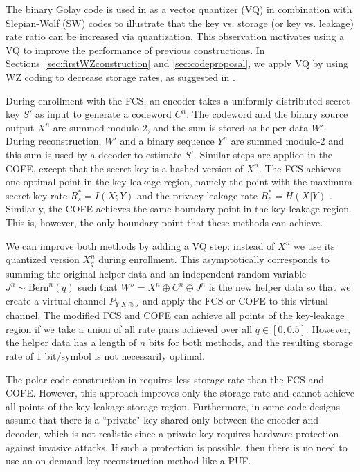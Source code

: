 \documentclass[journal,10pt,twoside]{IEEEtran}
\newcommand*\xor{\mathbin{\oplus}}
\begin{document}
The binary Golay code is used in \cite{IgnaTrans} as a vector quantizer (VQ) in combination with Slepian-Wolf (SW) codes \cite{SW} to illustrate that the key vs. storage (or key vs. leakage) rate ratio can be increased via quantization. This observation motivates using a VQ to improve the performance of previous constructions. In Sections~\ref{sec:firstWZconstruction} and \ref{sec:codeproposal}, we apply VQ by using WZ coding to decrease storage rates, as suggested in \cite[Remark 4.5]{Blochbook}. 


During enrollment with the FCS, an encoder takes a uniformly distributed secret key $S'$ as input to generate a codeword $C^n$. The codeword and the binary source output $X^n$ are summed modulo-2, and the sum is stored as helper data $W'$. During reconstruction, $W'$ and a binary sequence $Y^n$ are summed modulo-2 and this sum is used by a decoder to estimate $S'$. Similar steps are applied in the COFE, except that the secret key is a hashed version of $X^n$. The FCS achieves one optimal point in the key-leakage region, namely the point with the maximum secret-key rate $R_s^*=I(X;Y)$ and the privacy-leakage rate $R_\ell^* =H(X|Y)$ \cite{IgnaFuzzy}. Similarly, the COFE achieves the same boundary point in the key-leakage region. This is, however, the only boundary point that these methods can achieve.

We can improve both methods by adding a VQ step: instead of $X^n$ we use its quantized version $X_q^n$ during enrollment. This asymptotically corresponds to summing the original helper data and an independent random variable $J^n\sim\text{Bern}^n(q)$ such that $W''=X^n\xor C^n\xor J^n$ is the new helper data so that we create a virtual channel $P_{Y|X\xor J}$ and apply the FCS or COFE to this virtual channel. The modified FCS and COFE can achieve all points of the key-leakage region if we take a union of all rate pairs achieved over all $q\in[0, 0.5]$. However, the helper data has a length of $n$ bits for both methods, and the resulting storage rate of $1$ bit/symbol is not necessarily optimal.

The polar code construction in \cite{IgnaPolar} requires less storage rate than the FCS and COFE. However, this approach improves only the storage rate and cannot achieve all points of the key-leakage-storage region. Furthermore, in \cite{IgnaPolar} some code designs assume that there is a ``private" key shared only between the encoder and decoder, which is not realistic since a private key requires hardware protection against invasive attacks. If such a protection is possible, then there is no need to use an on-demand key reconstruction method like a PUF. 
\end{document}
